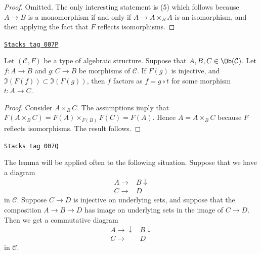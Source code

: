 \begin{proof}
Omitted. The only interesting statement is (5) which
follows because $A \to B$ is a monomorphism if and only if
$A \to A \times_B A$ is an isomorphism, and then applying
the fact that $F$ reflects isomorphisms.
\end{proof}

\begin{lemma}
\label{sheaves-lemma-image-contained-in}
\href{https://stacks.math.columbia.edu/tag/007P}{\texttt{Stacks tag 007P}}

Let $(\mathcal{C}, F)$ be a type of algebraic structure.
Suppose that $A, B, C \in \Ob(\mathcal{C})$.
Let $f : A \to B$ and $g : C \to B$ be morphisms of
$\mathcal{C}$. If $F(g)$ is injective, and
$\Im(F(f)) \subset \Im(F(g))$, then
$f$ factors as $f = g \circ t$ for some morphism
$t : A \to C$.
\end{lemma}

\begin{proof}
Consider $A \times_B C$. The assumptions imply that
$F(A \times_B C) = F(A) \times_{F(B)} F(C) = F(A)$.
Hence $A = A \times_B C$ because $F$ reflects isomorphisms.
The result follows.
\end{proof}

\begin{example}
\label{sheaves-example-application-lemma-image-contained-in}
\href{https://stacks.math.columbia.edu/tag/007Q}{\texttt{Stacks tag 007Q}}

The lemma will be applied often to the following situation.
Suppose that we have a diagram
$$
\begin{array}{cc}A \longrightarrow & B \downarrow \\ C \longrightarrow & D\end{array}
$$
in $\mathcal{C}$. Suppose $C \to D$ is injective on underlying
sets, and suppose that the composition $A \to B \to D$ has
image on underlying sets in the image of $C \to D$.
Then we get a commutative diagram
$$
\begin{array}{cc}A \longrightarrow\downarrow & B \downarrow \\ C \longrightarrow & D\end{array}
$$
in $\mathcal{C}$.
\end{example}

